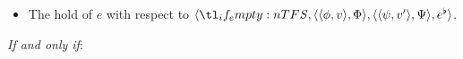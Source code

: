 \begin{note}
  \begin{definition}
    \label{def:tCCon}

    \begin{itemize}
    \item
      The \emph{} hold of \(e\) with respect to \(\langle \vAgent{}, \pvp{\phi}{v}{\Phi}, \pvp{\psi}{v'}{\Psi}, e^{\flat} \rangle\).
    \end{itemize}

    \emph{If and only if}:


\end{definition}
\end{note}
